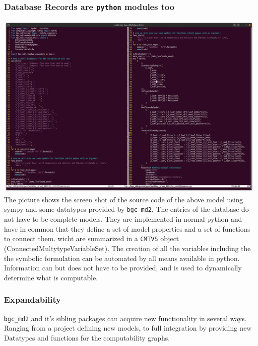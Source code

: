 \documentclass[36pt]{article}
\begin{document}
\begin{tcbposter}
{  \subsubsection*{Database Records are \texttt{python} modules too}
  \includegraphics[width=\columnwidth]{source.py.png}
    The picture shows the screen shot of the source code of the above model using sympy and some datatypes provided by \texttt{bgc\_md2}.
    The entries of the database do not have to be complete models. They are implemented in normal python and 
    have in common that they define a set of model properties and a set of functions to connect them.
    wicht are summarized in a \texttt{CMTVS} object (ConnectedMultytypeVariableSet). 
    The creation of all the variables including the the symbolic formulation can be automated by all means available in python.
    Information can but does not have to be provided, and is used to dynamically determine what is computable.

  \subsubsection*{Expandability}
  \texttt{bgc\_md2} and it's sibling packages can acquire new functionality in several ways.
  Ranging from a project defining new models, to full integration by providing new Datatypes and functions
  for the computability graphs.
  
}
\end{tcbposter}
\end{document}
